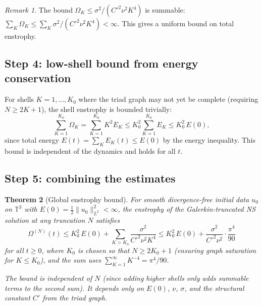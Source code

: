 \documentclass[11pt,a4paper]{article}
\newtheorem{theorem}{Theorem}[section]
\theoremstyle{remark}
\newtheorem{remark}[theorem]{Remark}
\newcommand{\T}{\mathbb{T}}
\begin{document}
\begin{remark}
The bound $\Omega_K \leq \sigma^2/(C'^2 \nu^2 K^4)$ is summable: $\sum_K \Omega_K \leq \sum_K \sigma^2/(C'^2\nu^2 K^4) < \infty$.  This gives a uniform bound on total enstrophy.
\end{remark}

\subsection{Step 4: low-shell bound from energy conservation}

For shells $K = 1, \ldots, K_0$ where the triad graph may not yet be complete (requiring $N \geq 2K+1$), the shell enstrophy is bounded trivially:
\[
  \sum_{K=1}^{K_0} \Omega_K = \sum_{K=1}^{K_0} K^2 E_K \leq K_0^2 \sum_{K=1}^{K_0} E_K \leq K_0^2\, E(0),
\]
since total energy $E(t) = \sum_K E_K(t) \leq E(0)$ by the energy inequality.  This bound is independent of the dynamics and holds for all $t$.

\subsection{Step 5: combining the estimates}

\begin{theorem}[Global enstrophy bound]\label{thm:enstrophy-bound}
For smooth divergence-free initial data $u_0$ on $\T^3$ with $E(0) = \frac{1}{2}\|u_0\|_{L^2}^2 < \infty$, the enstrophy of the Galerkin-truncated NS solution at any truncation $N$ satisfies
\[
  \Omega^{(N)}(t) \leq K_0^2\, E(0) + \sum_{K > K_0} \frac{\sigma^2}{C'^2 \nu^2 K^4} \leq K_0^2\, E(0) + \frac{\sigma^2}{C'^2 \nu^2} \cdot \frac{\pi^4}{90}
\]
for all $t \geq 0$, where $K_0$ is chosen so that $N \geq 2K_0 + 1$ (ensuring graph saturation for $K \leq K_0$), and the sum uses $\sum_{K=1}^\infty K^{-4} = \pi^4/90$.

The bound is independent of $N$ (since adding higher shells only adds summable terms to the second sum).  It depends only on $E(0)$, $\nu$, $\sigma$, and the structural constant $C'$ from the triad graph.
\end{theorem}
\end{document}
